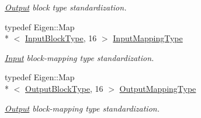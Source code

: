 \begin{DoxyCompactItemize}
\begin{DoxyCompactList}\small\item\em \hyperlink{classffnn_1_1layer_1_1_output}{Output} block type standardization. \end{DoxyCompactList}\item 
typedef Eigen\-::\-Map\\*
$<$ \hyperlink{classffnn_1_1layer_1_1_hidden_ae401b1af7763caf09a0dffcaf4f2d5e9}{Input\-Block\-Type}, 16 $>$ \hyperlink{classffnn_1_1layer_1_1_hidden_a9297d5b8ac45dc288ee1b91f15bb4047}{Input\-Mapping\-Type}
\begin{DoxyCompactList}\small\item\em \hyperlink{classffnn_1_1layer_1_1_input}{Input} block-\/mapping type standardization. \end{DoxyCompactList}\item 
typedef Eigen\-::\-Map\\*
$<$ \hyperlink{classffnn_1_1layer_1_1_hidden_a9b9e276188ef490ea5301f553225c735}{Output\-Block\-Type}, 16 $>$ \hyperlink{classffnn_1_1layer_1_1_hidden_a619ae9b0890cb86b66ac2b591b5a5610}{Output\-Mapping\-Type}
\begin{DoxyCompactList}\small\item\em \hyperlink{classffnn_1_1layer_1_1_output}{Output} block-\/mapping type standardization. \end{DoxyCompactList}\end{DoxyCompactItemize}
